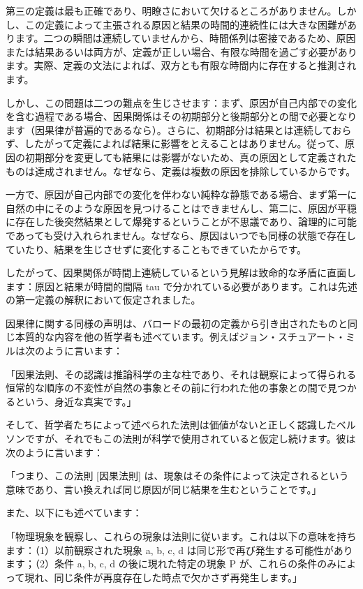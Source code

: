 \documentclass[a4paper,11pt,openany]{ltjsbook}
\begin{document}
第三の定義は最も正確であり、明瞭さにおいて欠けるところがありません。しかし、この定義によって主張される原因と結果の時間的連続性には大きな困難があります。二つの瞬間は連続していませんから、時間係列は密接であるため、原因または結果あるいは両方が、定義が正しい場合、有限な時間を過ごす必要があります。実際、定義の文法によれば、双方とも有限な時間内に存在すると推測されます。

しかし、この問題は二つの難点を生じさせます：まず、原因が自己内部での変化を含む過程である場合、因果関係はその初期部分と後期部分との間で必要となります（因果律が普遍的であるなら）。さらに、初期部分は結果とは連続しておらず、したがって定義によれば結果に影響をとえることはありません。従って、原因の初期部分を変更しても結果には影響がないため、真の原因として定義されたものは達成されません。なぜなら、定義は複数の原因を排除しているからです。

一方で、原因が自己内部での変化を伴わない純粋な静態である場合、まず第一に自然の中にそのような原因を見つけることはできませんし、第二に、原因が平穏に存在した後突然結果として爆発するということが不思議であり、論理的に可能であっても受け入れられません。なぜなら、原因はいつでも同様の状態で存在していたり、結果を生じさせずに変化することもできていたからです。

したがって、因果関係が時間上連続しているという見解は致命的な矛盾に直面します：原因と結果が時間的間隔 tau で分かれている必要があります。これは先述の第一定義の解釈において仮定されました。

因果律に関する同様の声明は、バロードの最初の定義から引き出されたものと同じ本質的な内容を他の哲学者も述べています。例えばジョン・スチュアート・ミルは次のように言います：


「因果法則、その認識は推論科学の主な柱であり、それは観察によって得られる恒常的な順序の不変性が自然の事象とその前に行われた他の事象との間で見つかるという、身近な真実です。」

そして、哲学者たちによって述べられた法則は価値がないと正しく認識したベルソンですが、それでもこの法則が科学で使用されていると仮定し続けます。彼は次のように言います：

「つまり、この法則 [因果法則] は、現象はその条件によって決定されるという意味であり、言い換えれば同じ原因が同じ結果を生むということです。」

また、以下にも述べています：

「物理現象を観察し、これらの現象は法則に従います。これは以下の意味を持ちます：（1）以前観察された現象 a, b, c, d は同じ形で再び発生する可能性があります；（2）条件 a, b, c, d の後に現れた特定の現象 P が、これらの条件のみによって現れ、同じ条件が再度存在した時点で欠かさず再発生します。」
\end{document}
